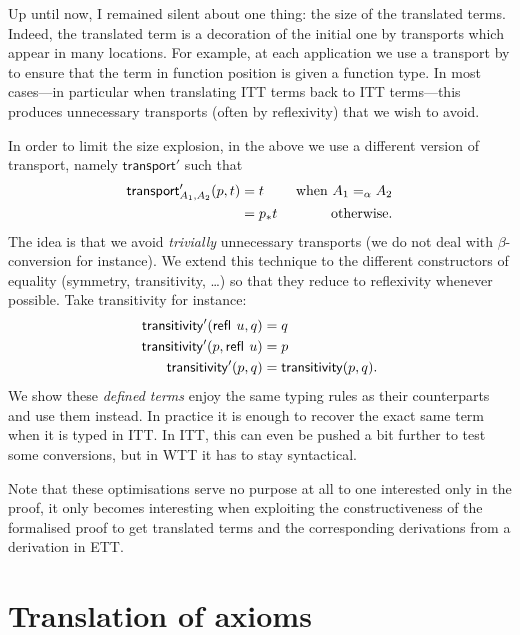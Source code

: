 Up until now, I remained silent about one thing: the size of the
translated terms. Indeed, the translated term is a decoration of the
initial one by transports which appear in many locations. For example,
at each application we use a transport by  to
ensure that the term in function position is given a function type. In
most cases---in particular when translating \acrshort{ITT} terms back to
\acrshort{ITT} terms---this produces unnecessary transports (often by
reflexivity) that we wish to avoid.

In order to limit the size explosion, in the above we use a different version of
transport, namely $\mathsf{transport}'$ such that
%
\begin{align*}
  \mathsf{transport}'_{A_1,A_2}(p,t) &= t &\text{ when } A_1 =_\alpha A_2 \\
  &= p_*{t} &\text{ otherwise.}
\end{align*}
%
The idea is that we avoid \emph{trivially} unnecessary transports (we do not
deal with $\beta$-conversion for instance).
We extend this technique to the different constructors of equality (symmetry,
transitivity, \dots) so that they reduce to reflexivity whenever possible.
Take transitivity for instance:
%
\begin{align*}
  \mathsf{transitivity}'({\mathsf{refl}}_{}\  u,q) &= q \\
  \mathsf{transitivity}'(p,{\mathsf{refl}}_{}\  u) &= p \\
  \mathsf{transitivity}'(p,q) &= \mathsf{transitivity}(p,q).
\end{align*}
%
We show these \emph{defined terms} enjoy the same typing rules as their
counterparts and use them instead.
In practice it is enough to recover the exact same term when it is typed in
\acrshort{ITT}.
In \acrshort{ITT}, this can even be pushed a bit further to test some
conversions, but in \acrshort{WTT} it has to stay syntactical.

Note that these optimisations serve no purpose at all to one interested only in
the proof, it only becomes interesting when exploiting the constructiveness of
the formalised proof to get translated terms and the corresponding derivations
from a derivation in \acrshort{ETT}.

\section{Translation of axioms}

